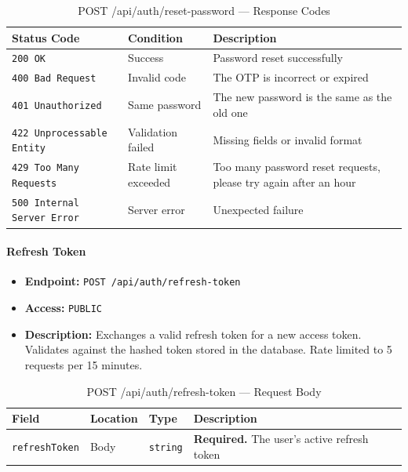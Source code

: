 \begin{table}[H]
\centering
\renewcommand{\arraystretch}{1.3}
\begin{tabularx}{\textwidth}{|l|l|X|}
\hline
\textbf{Status Code} & \textbf{Condition} & \textbf{Description} \\
\hline
\texttt{200 OK}           & Success             & Password reset successfully \\
\hline
\texttt{400 Bad Request}  & Invalid code        & The OTP is incorrect or expired \\
\hline
\texttt{401 Unauthorized} & Same password       & The new password is the same as the old one \\
\hline
\texttt{422 Unprocessable Entity} & Validation failed & Missing fields or invalid format \\
\hline
\texttt{429 Too Many Requests} & Rate limit exceeded & Too many password reset requests, please try again after an hour \\
\hline
\texttt{500 Internal Server Error} & Server error & Unexpected failure \\
\hline
\end{tabularx}
\caption{POST /api/auth/reset-password — Response Codes}
\label{tab:reset-password-responses}
\end{table}
\FloatBarrier

\paragraph{Refresh Token}
\label{subsubsec:refresh-token}

\begin{itemize}
  \item \textbf{Endpoint:} \texttt{POST /api/auth/refresh-token}
  \item \textbf{Access:} \texttt{PUBLIC}
  \item \textbf{Description:} Exchanges a valid refresh token for a new access token. Validates against the hashed token stored in the database. Rate limited to 5 requests per 15 minutes.
\end{itemize}

\begin{table}[H]
\centering
\renewcommand{\arraystretch}{1.3}
\begin{tabularx}{\textwidth}{|l|l|l|X|}
\hline
\textbf{Field} & \textbf{Location} & \textbf{Type} & \textbf{Description} \\
\hline
\texttt{refreshToken} & Body & \texttt{string} & \textbf{Required.} The user's active refresh token \\
\hline
\end{tabularx}
\caption{POST /api/auth/refresh-token — Request Body}
\label{tab:refresh-token-body}
\end{table}

